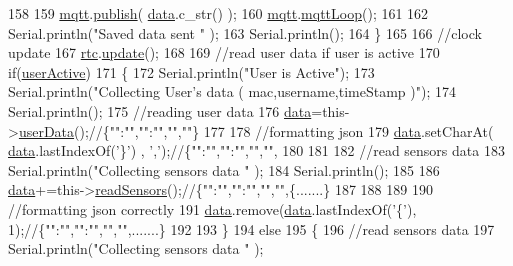 \begin{DoxyCode}
158 
159         \hyperlink{classCoolBoard_a2399f44d7c23c1149a335cb3b46d90f1}{mqtt}.\hyperlink{classCoolMQTT_ace977b3e90ab14b1199fe5c4fb0a13ec}{publish}( \hyperlink{classCoolBoard_a427fb753dd8575bdf821c70a5c63d695}{data}.c\_str() );
160         \hyperlink{classCoolBoard_a2399f44d7c23c1149a335cb3b46d90f1}{mqtt}.\hyperlink{classCoolMQTT_aa5eaae967b562b62cbcf2b8d81f6e5d5}{mqttLoop}();
161         
162         Serial.println(\textcolor{stringliteral}{"Saved data sent "} );
163         Serial.println();
164     \}
165 
166     \textcolor{comment}{//clock update}
167     \hyperlink{classCoolBoard_a50d2a6716879d64a85f3c6b44ad63275}{rtc}.\hyperlink{classCoolTime_aae601f795452cfa48d9fb337aed483a8}{update}();
168 
169     \textcolor{comment}{//read user data if user is active}
170     \textcolor{keywordflow}{if}(\hyperlink{classCoolBoard_a6395459131d6889a3005f79c7a35e964}{userActive})
171     \{
172         Serial.println(\textcolor{stringliteral}{"User is Active"});
173         Serial.println(\textcolor{stringliteral}{"Collecting User's data ( mac,username,timeStamp )"});
174         Serial.println();
175         \textcolor{comment}{//reading user data}
176         \hyperlink{classCoolBoard_a427fb753dd8575bdf821c70a5c63d695}{data}=this->\hyperlink{classCoolBoard_ae7358fb6e623cfc81b775f5f1734909b}{userData}();\textcolor{comment}{//\{"":"","":"","",""\}}
177 
178         \textcolor{comment}{//formatting json }
179         \hyperlink{classCoolBoard_a427fb753dd8575bdf821c70a5c63d695}{data}.setCharAt( \hyperlink{classCoolBoard_a427fb753dd8575bdf821c70a5c63d695}{data}.lastIndexOf(\textcolor{charliteral}{'\}'}) , \textcolor{charliteral}{','});\textcolor{comment}{//\{"":"","":"","","",}
180         
181                 
182         \textcolor{comment}{//read sensors data}
183         Serial.println(\textcolor{stringliteral}{"Collecting sensors data "} );
184         Serial.println();
185 
186         \hyperlink{classCoolBoard_a427fb753dd8575bdf821c70a5c63d695}{data}+=this->\hyperlink{classCoolBoard_ad03abdce2e65f520bbf2cff0f2d083cf}{readSensors}();\textcolor{comment}{//\{"":"","":"","","",\{.......\}}
187 
188         
189 
190         \textcolor{comment}{//formatting json correctly}
191         \hyperlink{classCoolBoard_a427fb753dd8575bdf821c70a5c63d695}{data}.remove(\hyperlink{classCoolBoard_a427fb753dd8575bdf821c70a5c63d695}{data}.lastIndexOf(\textcolor{charliteral}{'\{'}), 1);\textcolor{comment}{//\{"":"","":"","","",.......\}}
192                 
193     \}   
194     \textcolor{keywordflow}{else}
195     \{
196         \textcolor{comment}{//read sensors data}
197         Serial.println(\textcolor{stringliteral}{"Collecting sensors data "} );

\end{DoxyCode}
